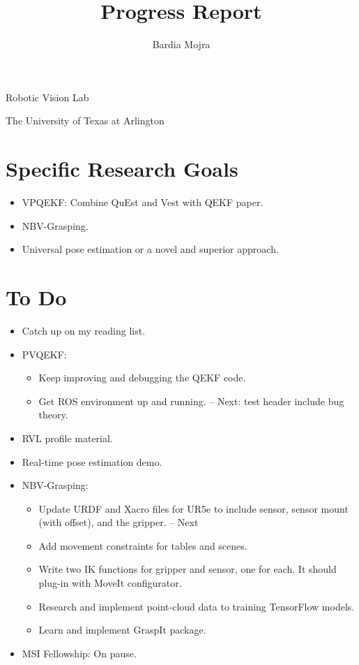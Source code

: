 \documentclass[11pt]{article}
\title{Progress Report}
\author{Bardia Mojra}
\begin{document}
\maketitle
\thispagestyle{empty}

\bigskip
\bigskip
\begin{center}
      Robotic Vision Lab
\end{center}

\begin{center}
      The University of Texas at Arlington
\end{center}

\newpage

\section{Specific Research Goals}
\begin{itemize}
      \item VPQEKF: Combine QuEst and Vest with QEKF paper.
      \item NBV-Grasping.
      \item Universal pose estimation or a novel and superior approach.
\end{itemize}

\section{To Do}
\begin{itemize}
  \item Catch up on my reading list.
  \item PVQEKF:
  \begin{itemize}
      \item Keep improving and debugging the QEKF code.
      \item Get ROS environment up and running. -- Next: test header include bug theory.
  \end{itemize}
  \item RVL profile material.
  \item Real-time pose estimation demo.
  \item NBV-Grasping:
      \begin{itemize}
      \item Update URDF and Xacro files for UR5e to include sensor, sensor mount (with offset), and the gripper. -- Next
      \item Add movement constraints for tables and scenes.
      \item Write two IK functions for gripper and sensor, one for each. It should plug-in with MoveIt configurator.
      \item Research and implement point-cloud data to training TensorFlow models.
      \item Learn and implement GraspIt package.
      \end{itemize}
  \item MSI Fellowship: On pause.
\end{itemize}
\end{document}

